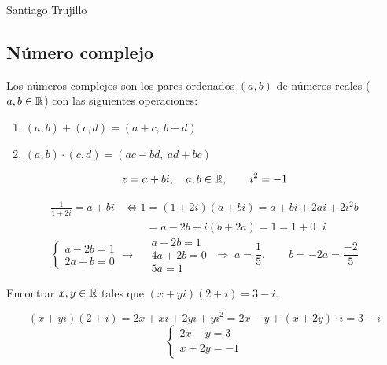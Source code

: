 \documentclass[11pt,a4paper]{article}
\begin{document}
\maketitle
\vspace{-1.6em}
\begin{center}
  {\normalsize Santiago Trujillo\par}
\end{center}
\vspace{0.5em}
\tableofcontents



\subsection{Número complejo}

\begin{definicion}
Los números complejos son los pares ordenados $(a,b)$ de números reales ($a,b\in\mathbb{R}$) con las siguientes operaciones:
\begin{enumerate}[label=(\arabic*)]
  \item $(a,b)+(c,d)=(a+c,\ b+d)$
  \item $(a,b)\cdot(c,d)=(ac-bd,\ ad+bc)$
\end{enumerate}
\end{definicion}

\[
z=a+bi,\quad a,b\in\mathbb{R},\qquad i^2=-1
\]

\begin{align*}
\frac{1}{1+2i}=a+bi &\iff 1=(1+2i)(a+bi)=a+bi+2ai+2i^2b\\
&\phantom{\iff 1}=a-2b+i(b+2a)=1=1+0\cdot i
\end{align*}
\[
\begin{cases} a-2b=1\\ 2a+b=0 \end{cases}
\longrightarrow\quad
\begin{array}{r}
a-2b=1\\
4a+2b=0\\ \hline
5a=1
\end{array}
\;\Rightarrow\; a=\frac15,\qquad b=-2a=\frac{-2}{5}
\]

\begin{ejercicio}
Encontrar $x,y\in\mathbb{R}$ tales que $(x+yi)(2+i)=3-i$.
\end{ejercicio}
\begin{solucion}
\[
(x+yi)(2+i)=2x+xi+2yi+yi^2=2x-y+(x+2y)\cdot i=3-i
\]
\[
\begin{cases} 2x-y=3\\ x+2y=-1 \end{cases}
\]
\end{solucion}
\end{document}
